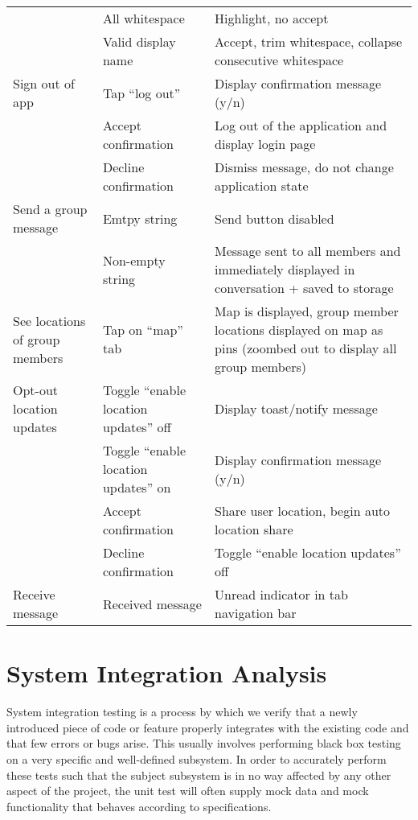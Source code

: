 \begin{tabularx}{\linewidth}{|X|X|X|}
                   & All whitespace & Highlight, no accept \\
                   & Valid display name & Accept, trim whitespace, collapse consecutive whitespace \\
\hline
Sign out of app & Tap ``log out'' & Display confirmation message (y/n) \\
                & Accept confirmation & Log out of the application and display login page \\
                & Decline confirmation & Dismiss message, do not change application state \\
\hline
Send a group message & Emtpy string & Send button disabled \\
                     & Non-empty string & Message sent to all members and immediately displayed in conversation + saved to storage \\
\hline
See locations of group members & Tap on ``map'' tab & Map is displayed, group member locations displayed on map as pins (zoombed out to display all group members) \\
\hline
Opt-out location updates & Toggle ``enable location updates'' off & Display toast/notify message \\
                         & Toggle ``enable location updates'' on & Display confirmation message (y/n) \\
                         & Accept confirmation & Share user location, begin auto location share \\
                         & Decline confirmation & Toggle ``enable location updates'' off \\
\hline
Receive message & Received message & Unread indicator in tab navigation bar \\
\hline
\end{tabularx}


\section{System Integration Analysis}

System integration testing is a process by which we verify that a newly
introduced piece of code or feature properly integrates with the existing code
and that few errors or bugs arise. This usually involves performing black box
testing on a very specific and well-defined subsystem. In order to accurately
perform these tests such that the subject subsystem is in no way affected by any
other aspect of the project, the unit test will often supply mock data and
mock functionality that behaves according to specifications.

